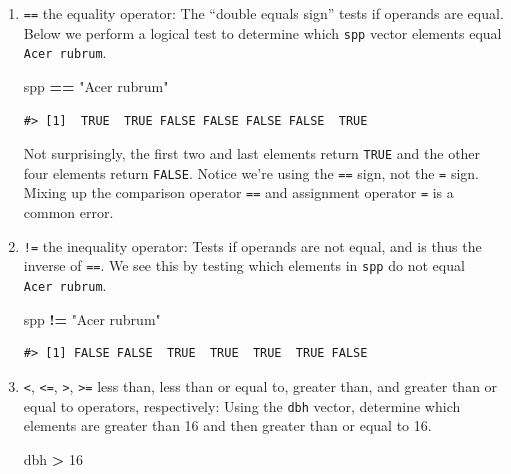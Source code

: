 \documentclass[
  11pt,
]{krantz}
\newenvironment{Shaded}{\begin{snugshade}}{\end{snugshade}}
\newcommand{\DecValTok}[1]{\textcolor[rgb]{0.00,0.00,0.81}{#1}}
\newcommand{\NormalTok}[1]{#1}
\newcommand{\OperatorTok}[1]{\textcolor[rgb]{0.81,0.36,0.00}{\textbf{#1}}}
\newcommand{\StringTok}[1]{\textcolor[rgb]{0.31,0.60,0.02}{#1}}
\theoremstyle{definition}
\theoremstyle{definition}
\theoremstyle{definition}
\theoremstyle{definition}
\theoremstyle{remark}
\begin{document}
\begin{enumerate}
\def\labelenumi{\arabic{enumi}.}
\item
  \texttt{==} the equality operator: The ``double equals sign'' tests if operands are equal. Below we perform a logical test to determine which \texttt{spp} vector elements equal \texttt{Acer\ rubrum}.

\begin{Shaded}
\begin{Highlighting}[]
\NormalTok{spp }\OperatorTok{==}\StringTok{ "Acer rubrum"}
\end{Highlighting}
\end{Shaded}

\begin{verbatim}
#> [1]  TRUE  TRUE FALSE FALSE FALSE FALSE  TRUE
\end{verbatim}

  Not surprisingly, the first two and last elements return \texttt{TRUE} and the other four elements return \texttt{FALSE}. Notice we're using the \texttt{==} sign, not the \texttt{=} sign. Mixing up the comparison operator \texttt{==} and assignment operator \texttt{=} is a common error.
\item
  \texttt{!=} the inequality operator: Tests if operands are not equal, and is thus the inverse of \texttt{==}. We see this by testing which elements in \texttt{spp} do not equal \texttt{Acer\ rubrum}.

\begin{Shaded}
\begin{Highlighting}[]
\NormalTok{spp }\OperatorTok{!=}\StringTok{ "Acer rubrum"}
\end{Highlighting}
\end{Shaded}

\begin{verbatim}
#> [1] FALSE FALSE  TRUE  TRUE  TRUE  TRUE FALSE
\end{verbatim}
\item
  \texttt{\textless{}}, \texttt{\textless{}=}, \texttt{\textgreater{}}, \texttt{\textgreater{}=} less than, less than or equal to, greater than, and greater than or equal to operators, respectively: Using the \texttt{dbh} vector, determine which elements are greater than 16 and then greater than or equal to 16.

\begin{Shaded}
\begin{Highlighting}[]
\NormalTok{dbh }\OperatorTok{\textgreater{}}\StringTok{ }\DecValTok{16}
\end{Highlighting}
\end{Shaded}


\end{enumerate}
\end{document}
